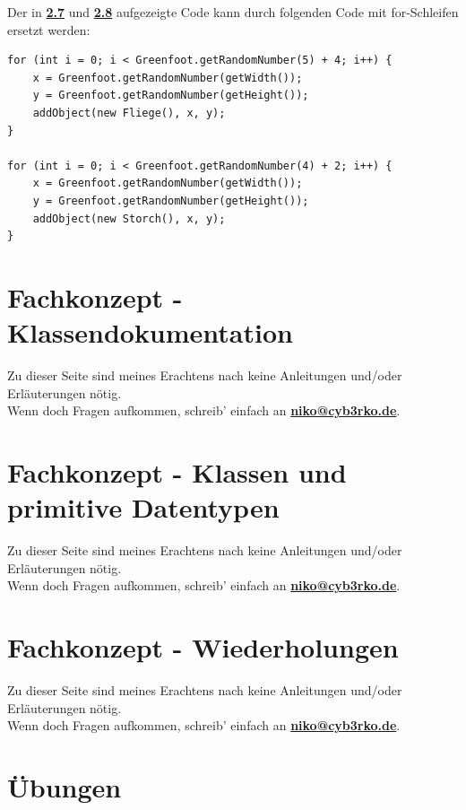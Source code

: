 \documentclass{scrartcl}   %
\begin{document}
Der in \hyperlink{subsection.2.7}{\textbf{2.7}} und \hyperlink{subsection.2.8}{\textbf{2.8}} aufgezeigte Code kann durch folgenden Code mit for-Schleifen ersetzt werden:\\
\begin{lstlisting}
for (int i = 0; i < Greenfoot.getRandomNumber(5) + 4; i++) {
    x = Greenfoot.getRandomNumber(getWidth());
    y = Greenfoot.getRandomNumber(getHeight());
    addObject(new Fliege(), x, y);
}
        
for (int i = 0; i < Greenfoot.getRandomNumber(4) + 2; i++) {
    x = Greenfoot.getRandomNumber(getWidth());
    y = Greenfoot.getRandomNumber(getHeight());
    addObject(new Storch(), x, y);
}
\end{lstlisting}

\newpage

\section{Fachkonzept - Klassendokumentation}

Zu dieser Seite sind meines Erachtens nach keine Anleitungen und/oder Erläuterungen nötig.\\
Wenn doch Fragen aufkommen, schreib' einfach an \textbf{\href{mailto:niko@cyb3rko.de}{niko@cyb3rko.de}}.

\newpage

\section{Fachkonzept - Klassen und primitive Datentypen}

Zu dieser Seite sind meines Erachtens nach keine Anleitungen und/oder Erläuterungen nötig.\\
Wenn doch Fragen aufkommen, schreib' einfach an \textbf{\href{mailto:niko@cyb3rko.de}{niko@cyb3rko.de}}.

\newpage

\section{Fachkonzept - Wiederholungen}

Zu dieser Seite sind meines Erachtens nach keine Anleitungen und/oder Erläuterungen nötig.\\
Wenn doch Fragen aufkommen, schreib' einfach an \textbf{\href{mailto:niko@cyb3rko.de}{niko@cyb3rko.de}}.

\newpage

\section{Übungen}
\end{document}
